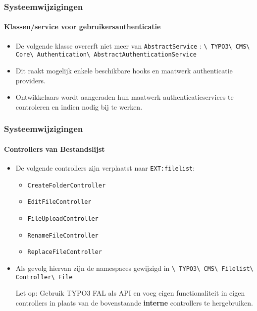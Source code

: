 \begin{frame}[fragile]
	\frametitle{Systeemwijzigingen}
	\framesubtitle{Klassen/service voor gebruikersauthenticatie}

	\begin{itemize}

		\item De volgende klasse overerft niet meer van
			\smaller\texttt{AbstractService}\normalsize\hspace{0.1cm}
			:
			\smaller\texttt{\textbackslash
				TYPO3\textbackslash
				CMS\textbackslash
				Core\textbackslash
				Authentication\textbackslash
				AbstractAuthenticationService}\normalsize

		\item Dit raakt mogelijk enkele beschikbare hooks en maatwerk authenticatie providers.

		\item Ontwikkelaars wordt aangeraden hun maatwerk authenticatieservices te controleren
			en indien nodig bij te werken.

	\end{itemize}

\end{frame}


\begin{frame}[fragile]
	\frametitle{Systeemwijzigingen}
	\framesubtitle{Controllers van Bestandslijst}

	\begin{itemize}
		\item De volgende controllers zijn verplaatst naar \texttt{EXT:filelist}:

			\begin{itemize}\small
				\item \texttt{CreateFolderController}
				\item \texttt{EditFileController}
				\item \texttt{FileUploadController}
				\item \texttt{RenameFileController}
				\item \texttt{ReplaceFileController}
			\end{itemize}\normalsize

		\item Als gevolg hiervan zijn de namespaces gewijzigd in\newline
			\texttt{\textbackslash
				TYPO3\textbackslash
				CMS\textbackslash
				Filelist\textbackslash
				Controller\textbackslash
				File}

		\vspace{0.2cm}

		\small
			Let op: Gebruik TYPO3 FAL als API en voeg eigen functionaliteit
			in eigen controllers in plaats van de bovenstaande \textbf{interne}
			controllers te hergebruiken.
		\normalsize

	\end{itemize}

\end{frame}

